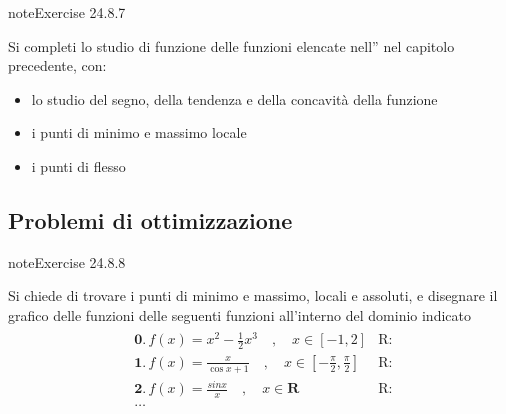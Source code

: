 \documentclass[letterpaper,10pt,italian]{jupyterBook}
\begin{document}
\begin{sphinxadmonition}{note}{Exercise 24.8.7}



\sphinxAtStartPar
Si completi lo studio di funzione delle funzioni elencate nell”{\hyperref[\detokenize{ch/infinitesimal_calculus/analysis-problems:infinitesimal-calculus-analysis-problems-funs}]{}} nel capitolo precedente, con:
\begin{itemize}
\item {} 
\sphinxAtStartPar
lo studio del segno, della tendenza e della concavità della funzione

\item {} 
\sphinxAtStartPar
i punti di minimo e massimo locale

\item {} 
\sphinxAtStartPar
i punti di flesso

\end{itemize}
\end{sphinxadmonition}


\subsection{Problemi di ottimizzazione}
\label{\detokenize{ch/infinitesimal_calculus/derivatives-problems:problemi-di-ottimizzazione}}\label{\detokenize{ch/infinitesimal_calculus/derivatives-problems:infinitesimal-calculus-derivatives-problems-opt}} \label{exercise:ch/infinitesimal_calculus/derivatives-problems-exercise-7}

\begin{sphinxadmonition}{note}{Exercise 24.8.8}



\sphinxAtStartPar
Si chiede di trovare i punti di minimo e massimo, locali e assoluti, e disegnare il grafico delle funzioni delle seguenti funzioni all’interno del dominio indicato
\begin{equation*}
\begin{split}\begin{aligned}
 & \mathbf{0.} \, f(x) = x^2 - \frac{1}{2} x^3 \quad , \quad x \in [-1,2] & \text{R: } \\
 & \mathbf{1.} \, f(x) = \frac{x}{\cos x + 1}  \quad , \quad x \in \left[ -\frac{\pi}{2}, \frac{\pi}{2} \right]  & \text{R: } \\
 & \mathbf{2.} \, f(x) = \frac{sin{x}}{x} \quad , \quad x \in \mathbf{R} & \text{R: } \\
 & \dots 
\end{aligned}\end{split}
\end{equation*}
\sphinxAtStartPar
{} 
\end{sphinxadmonition}
 \label{exercise:ch/infinitesimal_calculus/derivatives-problems-exercise-8}
\end{document}
